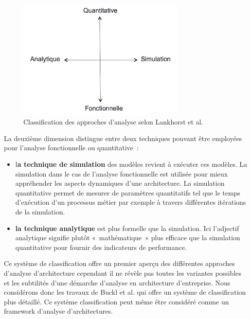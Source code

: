  

\begin{figure}[!htbp]
 \begin{center}
  \includegraphics[width=0.75\textwidth]{images/Chapitre1/dimesionsLankhorts.png}
 \end{center}
 \caption{Classification des approches d'analyse selon Lankhorst et al. \protect\cite{lankhorst2009enterprise}}
 \label{fig:classLankhorst}
\end{figure}

La deuxième dimension distingue entre deux techniques pouvant être employées pour l'analyse fonctionnelle ou quantitative~:
	\begin{itemize}
		\item l\textbf{a technique de simulation} des modèles revient à exécuter ces modèles. La simulation dans le cas de l'analyse fonctionnelle est utilisée pour mieux appréhender les aspects dynamiques d'une architecture. La simulation quantitative permet de mesurer de paramètres quantitatifs tel que le temps d'exécution d'un processus métier par exemple à travers différentes itérations de la simulation. 
		\item \textbf{la technique analytique} est plus formelle que la simulation. Ici l'adjectif analytique signifie plutôt «~mathématique~» plus efficace que la simulation quantitative pour fournir des indicateurs de performance.  
	\end{itemize}
	
Ce système de classification offre un premier aperçu des différentes approches d'analyse d'architecture cependant il ne révèle pas toutes les variantes possibles et les subtilités d'une démarche d'analyse en architecture d'entreprise. Nous considérons donc les travaux de Buckl  et al. qui offre un système de classification plus détaillé. Ce système classification peut même être considéré comme un framework d'analyse d'architectures.

